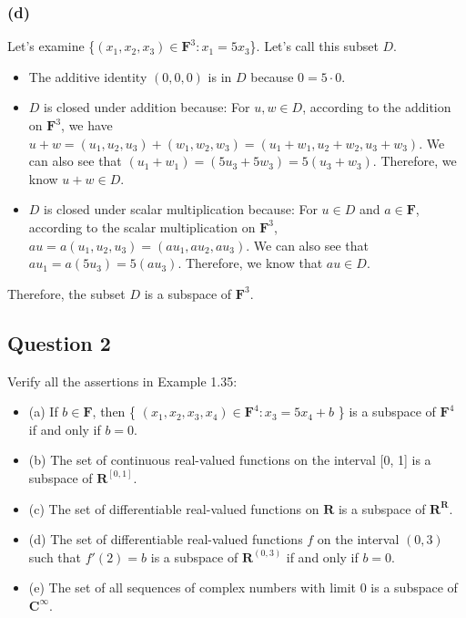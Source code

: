\documentclass[12pt, letterpaper, oneside]{book}
\begin{document}
\subsubsection*{(d)}

Let's examine \{$(x_1, x_2, x_3) \in \mathbf{F}^3: x_1 = 5x_3$\}.
Let's call this subset $D$.

\begin{itemize}
  \item The additive identity $(0, 0, 0)$ is in $D$ because $0 = 5 \cdot 0$.
  \item $D$ is closed under addition because: For $u, w \in D$, according to
    the addition on $\mathbf{F}^3$, we have $u + w = (u_1, u_2, u_3) + (w_1,
    w_2, w_3) = (u_1 + w_1, u_2 + w_2, u_3 + w_3)$. We can also see that $(u_1
    + w_1) = (5u_3 + 5w_3) = 5(u_3 + w_3)$. Therefore, we know $u + w \in D$.
  \item $D$ is closed under scalar multiplication because: For $u \in D$ and $a
    \in \mathbf{F}$, according to the scalar multiplication on $\mathbf{F}^3$,
    $au = a(u_1, u_2, u_3) = (a u_1, a u_2, a u_3)$. We can also see that
    $a u_1 = a (5u_3) = 5(a u_3)$. Therefore, we know that $au \in D$.
\end{itemize}

Therefore, the subset $D$ is a subspace of $\mathbf{F}^3$.

\subsection{Question 2}

Verify all the assertions in Example 1.35:

\begin{itemize}
  \item (a) If $b \in \mathbf{F}$, then \{ $(x_1, x_2, x_3, x_4) \in
    \mathbf{F}^4: x_3 = 5x_4 + b$ \} is a subspace of $\mathbf{F}^4$ if and
    only if $b=0$.
  \item (b) The set of continuous real-valued functions on the interval [0, 1]
    is a subspace of $\mathbf{R}^{[0,1]}$.
  \item (c) The set of differentiable real-valued functions on $\mathbf{R}$ is
    a subspace of $\mathbf{R}^{\mathbf{R}}$.
  \item (d) The set of differentiable real-valued functions $f$ on the interval
    $(0, 3)$ such that $f'(2) = b$ is a subspace of $\mathbf{R}^{(0,3)}$ if and
    only if $b = 0$.
  \item (e) The set of all sequences of complex numbers with limit 0 is a
    subspace of $\mathbf{C}^{\infty}$.
\end{itemize}
\end{document}
